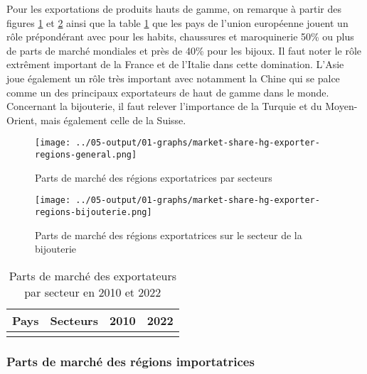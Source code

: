 \documentclass[french,10pt,a4paper]{article}
\begin{document}
Pour les exportations de produits hauts de gamme, on remarque à partir des figures \ref{fig:market-share-hg-exporter-regions-general} et \ref{fig:market-share-hg-exporter-regions-bijouterie} ainsi que la table \ref{tab:market-share-country-exporter} que les pays de l'union européenne jouent un rôle prépondérant avec pour les habits, chaussures et maroquinerie 50\% ou plus de parts de marché mondiales et près de 40\% pour les bijoux. Il faut noter le rôle extrêment important de la France et de l'Italie dans cette domination. L'Asie joue également un rôle très important avec notamment la Chine qui se palce comme un des principaux exportateurs de haut de gamme dans le monde. Concernant la bijouterie, il faut relever l'importance de la Turquie et du Moyen-Orient, mais également celle de la Suisse. 

\begin{figure}[!h]
  \centering \texttt{[image: ../05-output/01-graphs/market-share-hg-exporter-regions-general.png]}
  \caption{Parts de marché des régions exportatrices par secteurs}
  \label{fig:market-share-hg-exporter-regions-general}
\end{figure}

\begin{figure}[!h]
  \centering \texttt{[image: ../05-output/01-graphs/market-share-hg-exporter-regions-bijouterie.png]}
  \caption{Parts de marché des régions exportatrices sur le secteur de la bijouterie}
  \label{fig:market-share-hg-exporter-regions-bijouterie}
\end{figure}

\begin{table}[ht]
  \centering
  \begin{tabular}{lrrr}
    \hline
   Pays & Secteurs & 2010 & 2022 \\
    \hline
    \\
    \hline
  \end{tabular}
  \caption{Parts de marché des exportateurs par secteur en 2010 et 2022}
  \label{tab:market-share-country-exporter}
\end{table}

\subsubsection{Parts de marché des régions importatrices}
\end{document}
